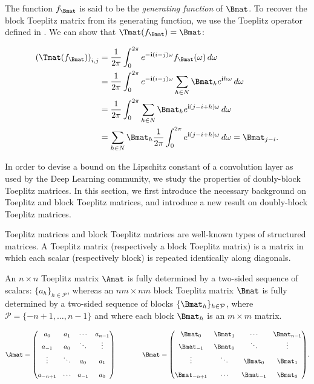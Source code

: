 The function $f_{\Bmat}$ is said to be the \emph{generating function} of $\Bmat$. To recover the block Toeplitz matrix from its generating function, we use the Toeplitz operator defined in . We can show that $\Tmat(f_\Bmat) = \Bmat$:

\begingroup
\allowdisplaybreaks
\begin{align}
    \leftmat \Tmat(f_\Bmat) \rightmat_{i, j} &= \frac{1}{2\pi} \int_0^{2\pi} e^{-\ci (i-j)\omega} f_{\Bmat}(\omega) \,d\omega  \\
    &= \frac{1}{2\pi} \int_0^{2\pi} e^{-\ci (i-j) \omega} \sum_{h \in N} \Bmat_h e^{\ci h \omega} \,d\omega  \\
    &= \frac{1}{2\pi} \int_0^{2\pi} \sum_{h \in N} \Bmat_h e^{\ci (j - i + h) \omega} \,d\omega  \\
    &= \sum_{h \in N} \Bmat_h \frac{1}{2\pi} \int_0^{2\pi} e^{\ci (j - i + h) \omega} \,d\omega 
    = \Bmat_{j-i} .
\end{align}
\endgroup




In order to devise a bound on the Lipschitz constant of a convolution layer as used by the Deep Learning community, we study the properties of doubly-block Toeplitz matrices.
In this section, we first introduce the necessary background on Toeplitz and block Toeplitz matrices, and introduce a new result on doubly-block Toeplitz matrices.

Toeplitz matrices and block Toeplitz matrices are well-known types of structured matrices.
A Toeplitz matrix  (respectively a block Toeplitz matrix) is a matrix in which each scalar (respectively block) is repeated identically along diagonals.

An $n \times n$ Toeplitz matrix $\Amat$ is fully determined by a two-sided sequence of scalars: $\{a_h\}_{h \in \mathcal{P}}$, whereas an $nm\times nm$ block Toeplitz matrix $\Bmat$ is fully determined by a two-sided sequence of blocks $\{\Bmat_h\}_{h \in \mathcal{P}}$, where $\mathcal{P} = \{-n+1,\dots, n-1\}$ and where each block $\Bmat_h$ is an $m \times m$ matrix.

\begin{equation*}
  \Amat = \leftmatrix
    a_0 & a_{1} & \cdots & a_{n-1} \\ \vspace{0.1cm}
    a_{-1} & a_0 & \ddots & \vdots \\ \vspace{0.3cm}
   \vdots & \ddots & a_{0} & a_{1} \\ 
  a_{-n+1} & \cdots  & a_{-1}    & a_0 
  \rightmatrix \quad \quad \quad \quad 
    \Bmat = \leftmatrix
    \Bmat_0 & \Bmat_{1} & \cdots & \Bmat_{n-1} \\ \vspace{0.1cm}
    \Bmat_{-1} & \Bmat_0 & \ddots & \vdots \\ \vspace{0.3cm}
   \vdots & \ddots & \Bmat_0 & \Bmat_{1} \\ 
  \Bmat_{-n+1} & \cdots  & \Bmat_{-1}  & \Bmat_0 
  \rightmatrix.
\end{equation*}

